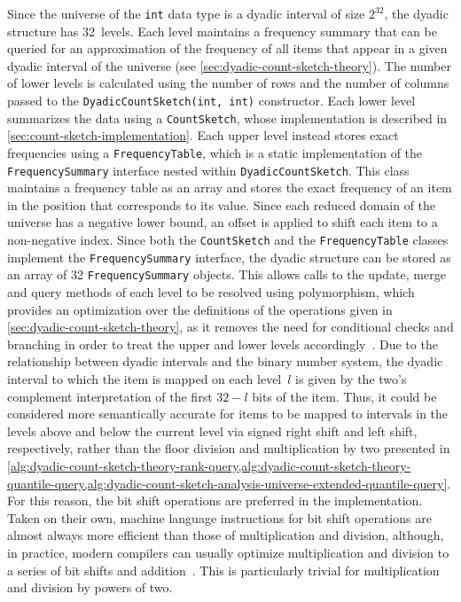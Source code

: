 Since the universe of the \lstinline{int} data type is a dyadic interval of size \( 2^{32} \), the dyadic structure has \num{32}~levels.
Each level maintains a frequency summary that can be queried for an approximation of the frequency of all items that appear in a given dyadic interval of the universe (see \cref{sec:dyadic-count-sketch-theory}).
The number of lower levels is calculated using the number of rows and the number of columns passed to the \lstinline{DyadicCountSketch(int, int)} constructor.
Each lower level summarizes the data using a \lstinline{CountSketch}, whose implementation is described in \cref{sec:count-sketch-implementation}.
Each upper level instead stores exact frequencies using a \lstinline{FrequencyTable}, which is a static implementation of the \lstinline{FrequencySummary} interface nested within \lstinline{DyadicCountSketch}.
This class maintains a frequency table as an array and stores the exact frequency of an item in the position that corresponds to its value.
Since each reduced domain of the universe has a negative lower bound, an offset is applied to shift each item to a non-negative index.
Since both the \lstinline{CountSketch} and the \lstinline{FrequencyTable} classes implement the \lstinline{FrequencySummary} interface, the dyadic structure can be stored as an array of \num{32} \lstinline{FrequencySummary} objects.
This allows calls to the update, merge and query methods of each level to be resolved using polymorphism, which provides an optimization over the definitions of the operations given in \cref{sec:dyadic-count-sketch-theory}, as it removes the need for conditional checks and branching in order to treat the upper and lower levels accordingly~\citep{dasu02}.
Due to the relationship between dyadic intervals and the binary number system, the dyadic interval to which the item is mapped on each level~\( l \) is given by the two's complement interpretation of the first \( 32 - l \) bits of the item.
Thus, it could be considered more semantically accurate for items to be mapped to intervals in the levels above and below the current level via signed right shift and left shift, respectively, rather than the floor division and multiplication by two presented in \cref{alg:dyadic-count-sketch-theory-rank-query,alg:dyadic-count-sketch-theory-quantile-query,alg:dyadic-count-sketch-analysis-universe-extended-quantile-query}.
For this reason, the bit shift operations are preferred in the implementation.
Taken on their own, machine language instructions for bit shift operations are almost always more efficient than those of multiplication and division, although, in practice, modern compilers can usually optimize multiplication and division to a series of bit shifts and addition~\citep{warren12}.
This is particularly trivial for multiplication and division by powers of two.


